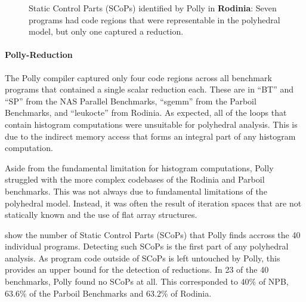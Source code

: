 \begin{figure}[p]
    \caption{Static Control Parts (SCoPs) identified by Polly in {\bf Rodinia}:
             Seven programs had code regions that were representable in
             the polyhedral model, but only one captured a reduction.}
    \label{rodinia_scops}
\end{figure}

    \paragraph*{Polly-Reduction}
    The Polly compiler captured only four code regions across all benchmark
    programs that contained a single scalar reduction each.
    These are in ``BT'' and ``SP'' from the NAS Parallel Benchmarks,
    ``sgemm'' from the Parboil Benchmarks, and ``leukocte'' from Rodinia.
    As expected, all of the loops that contain histogram computations were
    unsuitable for polyhedral analysis.
    This is due to the indirect memory access that forms an integral part of any
    histogram computation.

    Aside from the fundamental limitation for histogram computations, Polly
    struggled with the more complex codebases of the Rodinia and Parboil
    benchmarks.
    This was not always due to fundamental limitations of the polyhedral model.
    Instead, it was often the result of iteration spaces that are not statically
    known and the use of flat array structures.

     show the number of Static
    Control Parts (SCoPs) that Polly finds accross the 40 individual programs.
    Detecting such SCoPs is the first part of any polyhedral analysis.
    As program code outside of SCoPs is left untouched by Polly, this provides
    an upper bound for the detection of reductions.
    In 23 of the 40 benchmarks, Polly found no
    SCoPs at all.  This corresponded to $40\%$ of NPB, $63.6\%$ of the
    Parboil Benchmarks and $63.2\%$ of Rodinia.

